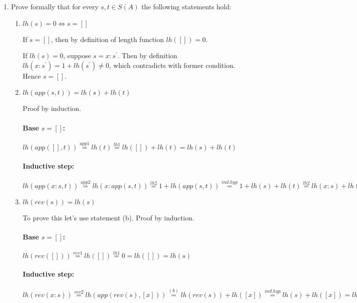 \documentclass{article}
\begin{document}
\begin{enumerate}
\textbf{Finally, after applying $init$}
\begin{align*}
init(n : (e : (d : (u : (t : (s : [])))))) =\\ n : init(e : (d : (u : (t : (s : []))))) = ... =\\ n : (e : (d : (u : (t : init([s]))))) =\\ n : (e : (d : (u : (t : [])))) = [nedut]
\end{align*}

\item Prove formally that for every $s, t \in S(A)$ the following statements hold:

\begin{enumerate}
\item $lh(s) = 0 \iff s = []$

If $s = []$, then by definition of length function $lh([]) = 0$.

If $lh(s) = 0$, suppose $s = x : s ^ \prime$. Then by definition $lh(x : s ^ \prime) = 1 + lh(s ^ \prime) \neq 0$, which contradicts with former condition. Hence $s = []$.

\item $lh(app(s, t)) = lh(s) + lh(t)$

Proof by induction.

\paragraph{Base $s = []$:}
$lh(app([], t)) \stackrel{app1}{=} lh(t) \stackrel{lh1}{=} lh([]) + lh(t) = lh(s) + lh(t)$

\paragraph{Inductive step:}
$lh(app(x : s, t)) \stackrel{app2}{=} lh(x : app(s, t)) \stackrel{lh2}{=} 1 + lh(app(s, t)) \stackrel{ind. hyp}{=} 1 + lh(s) + lh(t) \stackrel{lh2}{=} lh(x : s) + lh(t)$

\item $lh(rev(s)) = lh(s)$

To prove this let's use statement (b). Proof by induction.

\paragraph{Base $s = []$:}
$lh(rev([])) \stackrel{rev1}{=} lh([]) \stackrel{lh1}{=} 0 = lh([]) = lh(s)$

\paragraph{Inductive step:}
$lh(rev(x : s)) \stackrel{rev2}{=} lh(app(rev(s), [x])) \stackrel{(b)}{=} lh(rev(s)) + lh([x]) \stackrel{ind. hyp}{=} lh(s) + lh([x]) = lh([x]) + lh(s) \stackrel{(b)}{=} lh(app([x], s)) \stackrel{app2}{=} lh(x : app([], s)) \stackrel{app1}{=} lh(x : s)$


\end{enumerate}
\end{enumerate}
\end{document}
